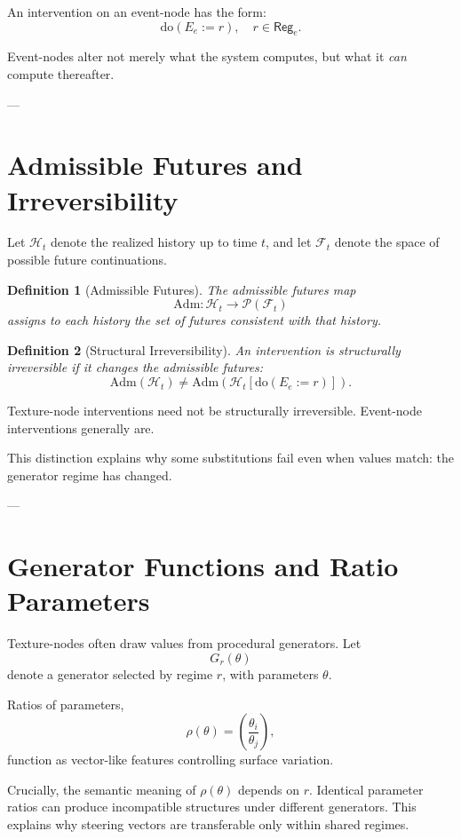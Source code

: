 \documentclass[11pt]{article}
\newtheorem{definition}{Definition}
\theoremstyle{remark}
\newcommand{\doop}{\mathrm{do}}
\newcommand{\Adm}{\mathrm{Adm}}
\newcommand{\Hist}{\mathcal{H}}
\newcommand{\Fut}{\mathcal{F}}
\newcommand{\Reg}{\mathsf{Reg}}
\begin{document}
An intervention on an event-node has the form:
\[
\doop(E_e := r), \quad r \in \Reg_e.
\]

Event-nodes alter not merely what the system computes, but what it \emph{can} compute thereafter.

---

\section{Admissible Futures and Irreversibility}

Let \(\Hist_t\) denote the realized history up to time \(t\), and let \(\Fut_t\) denote the space of possible future continuations.

\begin{definition}[Admissible Futures]
The admissible futures map
\[
\Adm : \Hist_t \to \mathcal{P}(\Fut_t)
\]
assigns to each history the set of futures consistent with that history.
\end{definition}

\begin{definition}[Structural Irreversibility]
An intervention is \emph{structurally irreversible} if it changes the admissible futures:
\[
\Adm(\Hist_t) \neq \Adm(\Hist_t[\doop(E_e := r)]).
\]
\end{definition}

Texture-node interventions need not be structurally irreversible. Event-node interventions generally are.

This distinction explains why some substitutions fail even when values match: the generator regime has changed.

---

\section{Generator Functions and Ratio Parameters}

Texture-nodes often draw values from procedural generators. Let
\[
G_r(\theta)
\]
denote a generator selected by regime \(r\), with parameters \(\theta\).

Ratios of parameters,
\[
\rho(\theta) = \left(\frac{\theta_i}{\theta_j}\right),
\]
function as vector-like features controlling surface variation.

Crucially, the semantic meaning of \(\rho(\theta)\) depends on \(r\). Identical parameter ratios can produce incompatible structures under different generators. This explains why steering vectors are transferable only within shared regimes.
\end{document}

